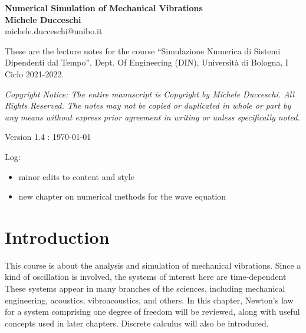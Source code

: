\documentclass[11pt,twoside,a4paper,english]{book}
\begin{document}
\begin{titlepage}
\begin{center}
 {\huge\bfseries Numerical Simulation of Mechanical Vibrations\\}
 \vspace{1.5cm}
 {\Large\bfseries Michele Ducceschi}\\[5pt]
 michele.ducceschi@unibo.it\\[14pt]
 \end{center}\vspace{2cm}
\vfill

{These are the lecture notes for the course ``Simulazione Numerica di Sistemi Dipendenti dal Tempo'', Dept. Of Engineering (DIN), Universit{\`a} di Bologna, I Ciclo 2021-2022. } \\[2cm]
\vfill


\emph{Copyright Notice: The entire manuscript is Copyright by Michele Ducceschi. All Rights Reserved. The notes may not be copied or duplicated in whole or part by any means without express prior agreement in writing or unless specifically noted.}\\[2cm]
\vfill


Version 1.4 : \today 
\vfill

Log: 
\begin{itemize}
    \item minor edits to content and style 
    \item new chapter on numerical methods for the wave equation
\end{itemize}


\end{titlepage}


\tableofcontents

\chapter{Introduction}\label{chap:Intro}

\noindent This course is about the analysis and simulation of mechanical vibrations. Since a kind of oscillation is involved, the systems of interest here are time-dependent These systems appear in many branches of the sciences, including mechanical engineering, acoustics, vibroacoustics, and others. In this chapter, Newton's law for a system comprising one degree of freedom will be reviewed, along with useful concepts used in later chapters. Discrete calculus will also be introduced. 
\end{document}
